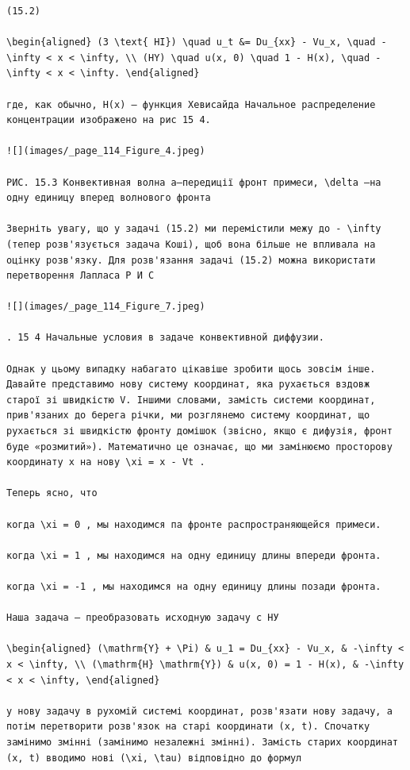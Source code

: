 \documentclass[
  ukrainian,
]{article}
\begin{document}
\begin{verbatim}
(15.2)

\begin{aligned} (3 \text{ HI}) \quad u_t &= Du_{xx} - Vu_x, \quad -\infty < x < \infty, \\ (HY) \quad u(x, 0) \quad 1 - H(x), \quad -\infty < x < \infty. \end{aligned}

где, как обычно, H(x) — функция Хевисайда Начальное распределение концентрации изображено на рис 15 4.

![](images/_page_114_Figure_4.jpeg)

РИС. 15.3 Конвективная волна a—передиції фронт примеси, \delta —на одну единицу вперед волнового фронта

Зверніть увагу, що у задачі (15.2) ми перемістили межу до - \infty (тепер розв'язується задача Коші), щоб вона більше не впливала на оцінку розв'язку. Для розв'язання задачі (15.2) можна використати перетворення Лапласа P И С

![](images/_page_114_Figure_7.jpeg)

. 15 4 Начальные условия в задаче конвективной диффузии.

Однак у цьому випадку набагато цікавіше зробити щось зовсім інше. Давайте представимо нову систему координат, яка рухається вздовж старої зі швидкістю V. Іншими словами, замість системи координат, прив'язаних до берега річки, ми розглянемо систему координат, що рухається зі швидкістю фронту домішок (звісно, якщо є дифузія, фронт буде «розмитий»). Математично це означає, що ми замінюємо просторову координату x на нову \xi = x - Vt .

Теперь ясно, что

когда \xi = 0 , мы находимся па фронте распространяющейся примеси.

когда \xi = 1 , мы находимся на одну единицу длины впереди фронта.

когда \xi = -1 , мы находимся на одну единицу длины позади фронта.

Наша задача — преобразовать исходную задачу с НУ

\begin{aligned} (\mathrm{Y} + \Pi) & u_1 = Du_{xx} - Vu_x, & -\infty < x < \infty, \\ (\mathrm{H} \mathrm{Y}) & u(x, 0) = 1 - H(x), & -\infty < x < \infty, \end{aligned}

у нову задачу в рухомій системі координат, розв'язати нову задачу, а потім перетворити розв'язок на старі координати (x, t). Спочатку замінимо змінні (замінимо незалежні змінні). Замість старих координат (x, t) вводимо нові (\xi, \tau) відповідно до формул


\end{verbatim}
\end{document}
